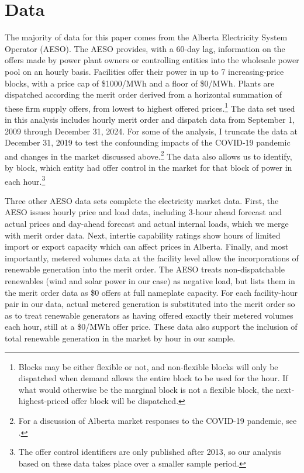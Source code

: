 \documentclass[12pt]{article}
\begin{document}
\section{Data}\label{sec:data}

The majority of data for this paper comes from the Alberta Electricity System Operator (AESO). The AESO provides, with a 60-day lag, information on the offers made by power plant owners or controlling entities into the wholesale power pool on an hourly basis. Facilities offer their power in up to 7 increasing-price blocks, with a price cap of \$1000/MWh and a floor of \$0/MWh. Plants are dispatched according the merit order derived from a horizontal summation of these firm supply offers, from lowest to highest offered prices.\footnote{Blocks may be either flexible or not, and non-flexible blocks will only be dispatched when demand allows the entire block to be used for the hour. If what would otherwise be the marginal block is not a flexible block, the next-highest-priced offer block will be dispatched.} The data set used in this analysis includes hourly merit order and dispatch data from September 1, 2009 through December 31, 2024. For some of the analysis, I truncate the data at December 31, 2019 to test the confounding impacts of the COVID-19 pandemic and changes in the market discussed above.\footnote{For a discussion of Alberta market responses to the COVID-19 pandemic, see \cite{leach_rivers_shaffer}.} The data also allows us to identify, by block, which entity had offer control in the market for that block of power in each hour.\footnote{The offer control identifiers are only published after 2013, so our analysis based on these data takes place over a smaller sample period.}

Three other AESO data sets complete the electricity market data. First, the AESO issues hourly price and load data, including 3-hour ahead forecast and actual prices and day-ahead forecast and actual internal loads, which we merge with merit order data. Next, intertie capability ratings show hours of limited import or export capacity which can affect prices in Alberta. Finally, and most importantly, metered volumes data at the facility level allow the incorporations of renewable generation into the merit order. The AESO treats non-dispatchable renewables (wind and solar power in our case) as negative load, but lists them in the merit order data as \$0 offers at full nameplate capacity. For each facility-hour pair in our data, actual metered generation is substituted into the merit order so as to treat renewable generators as having offered exactly their metered volumes each hour, still at a \$0/MWh offer price. These data also support the inclusion of total renewable generation in the market by hour in our sample.
\end{document}
